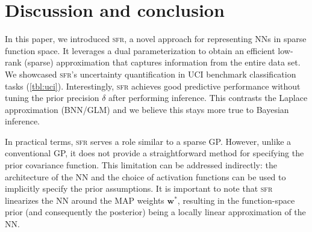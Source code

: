 \documentclass{article}
\newcommand{\our}{\textsc{sfr}\xspace}
\newcommand{\weights}{\ensuremath{\mathbf{w}}}
\begin{document}
\section{Discussion and conclusion}
\label{sec:conclusion}
%
In this paper, we introduced \our, a novel approach for representing NNs in sparse function space.
It leverages a dual parameterization to obtain an efficient low-rank (sparse) approximation that captures information from the entire data set.
We showcased \our's uncertainty quantification in UCI benchmark classification tasks (\cref{tbl:uci}).
Interestingly, \our achieves good predictive performance without tuning the prior precision $\delta$ after performing inference.
This contrasts the Laplace approximation (BNN/GLM) and we believe this stays more true to Bayesian inference.%


In practical terms, \our serves a role similar to a sparse GP. However, unlike a conventional GP, it does not provide a straightforward method for specifying the prior covariance function.
This limitation can be addressed indirectly: the architecture of the NN and the choice of activation functions can be used to implicitly specify the prior assumptions.
It is important to note that \our linearizes the NN around the MAP weights $\weights^{*}$, resulting in the function-space prior
(and consequently the posterior) being a locally linear approximation of the NN.
\end{document}
